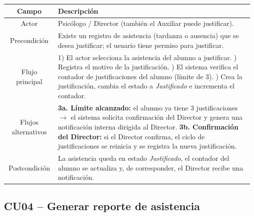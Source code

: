 \documentclass[a4paper,12pt]{article}
\begin{document}
\begin{table}[H]
\centering
\begin{tabularx}{\linewidth}{C X}
\toprule
\textbf{Campo} & \textbf{Descripción} \\
\midrule
Actor & Psicólogo / Director (también el Auxiliar puede justificar). \\
\addlinespace
Precondición &
  Existe un registro de asistencia (tardanza o ausencia) que se desea
  justificar; el usuario tiene permiso para justificar. \\
\addlinespace
Flujo principal &
  1) El actor selecciona la asistencia del alumno a justificar. ) Registra el motivo de la justificación. ) El sistema verifica el contador de justificaciones del alumno (límite de
     3). ) Crea la justificación, cambia el estado a \textit{Justificado} e
     incrementa el contador. \\
\addlinespace
Flujos alternativos &
  \textbf{3a. Límite alcanzado:} el alumno ya tiene 3 justificaciones
  $\rightarrow$ el sistema solicita confirmación del Director y genera una
  notificación interna dirigida al Director. \newline
  \textbf{3b. Confirmación del Director:} si el Director confirma, el ciclo de
  justificaciones se reinicia y se registra la nueva justificación. \\
\addlinespace
Postcondición &
  La asistencia queda en estado \textit{Justificado}, el contador del alumno se
  actualiza y, de corresponder, el Director recibe una notificación. \\
\bottomrule
\end{tabularx}
\end{table}

\subsection{CU04 -- Generar reporte de asistencia}
\end{document}
